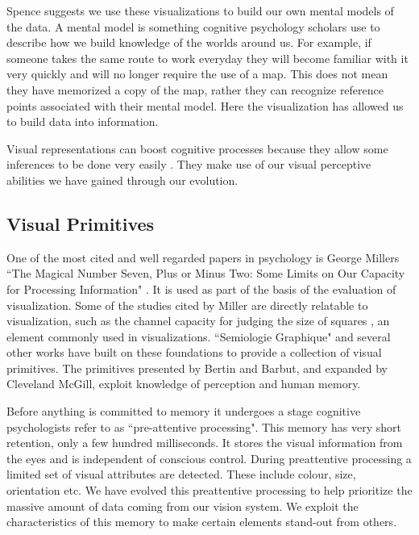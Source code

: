 \documentclass[a4paper, 10pt, titlepage, twocolumn, onehalfspace]{article}
\begin{document}
Spence \cite{spence2001information} suggests we use these visualizations to build our own mental models of the data. A mental model is something cognitive psychology scholars use to describe how we build knowledge of the worlds around us. For example, if someone takes the same route to work everyday they will become familiar with it very quickly and will no longer require the use of a map. This does not mean they have memorized a copy of the map, rather they can recognize reference points associated with their mental model. Here the visualization has allowed us to build data into information.

Visual representations can boost cognitive processes because they allow some inferences to be done very easily \cite{card1999readings}. They make use of our visual perceptive abilities we have gained through our evolution.

\subsection{Visual Primitives}
One of the most cited and well regarded papers in psychology is George Millers ``The Magical Number Seven, Plus or Minus Two: Some Limits on Our Capacity for Processing Information" \cite{Mil56}. It is used as part of the basis of the evaluation of visualization. Some of the studies cited by Miller are directly relatable to visualization, such as the channel capacity for judging the size of squares \cite{eriksen1955absolute}, an element commonly used in visualizations. ``Semiologie Graphique" \cite{bertin1973semiologie} and several other works have built on these foundations to provide a collection of visual primitives. The primitives presented by Bertin and Barbut, and expanded by Cleveland McGill, exploit knowledge of perception and human memory. 

Before anything is committed to memory it undergoes a stage cognitive psychologists refer to as ``pre-attentive processing". This memory has very short retention, only a few hundred milliseconds. It stores the visual information from the eyes and is independent of conscious control. During preattentive processing a limited set of visual attributes are detected. These include colour, size, orientation etc. We have evolved this preattentive processing to help prioritize the massive amount of data coming from our vision system. We exploit the characteristics of this memory to make certain elements stand-out from others.
\end{document}

